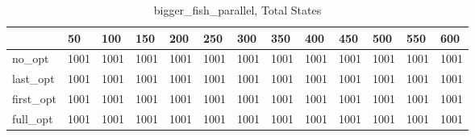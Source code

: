 \begin{table}
\caption{bigger\_fish\_parallel, Total States}
\label{bigger_fish_parallel_total}
\begin{tabular}{lllllllllllll}
\toprule
 & 50 & 100 & 150 & 200 & 250 & 300 & 350 & 400 & 450 & 500 & 550 & 600 \\
\midrule
no\_opt & 1001 & 1001 & 1001 & 1001 & 1001 & 1001 & 1001 & 1001 & 1001 & 1001 & 1001 & 1001 \\
last\_opt & 1001 & 1001 & 1001 & 1001 & 1001 & 1001 & 1001 & 1001 & 1001 & 1001 & 1001 & 1001 \\
first\_opt & 1001 & 1001 & 1001 & 1001 & 1001 & 1001 & 1001 & 1001 & 1001 & 1001 & 1001 & 1001 \\
full\_opt & 1001 & 1001 & 1001 & 1001 & 1001 & 1001 & 1001 & 1001 & 1001 & 1001 & 1001 & 1001 \\
\bottomrule
\end{tabular}
\end{table}
